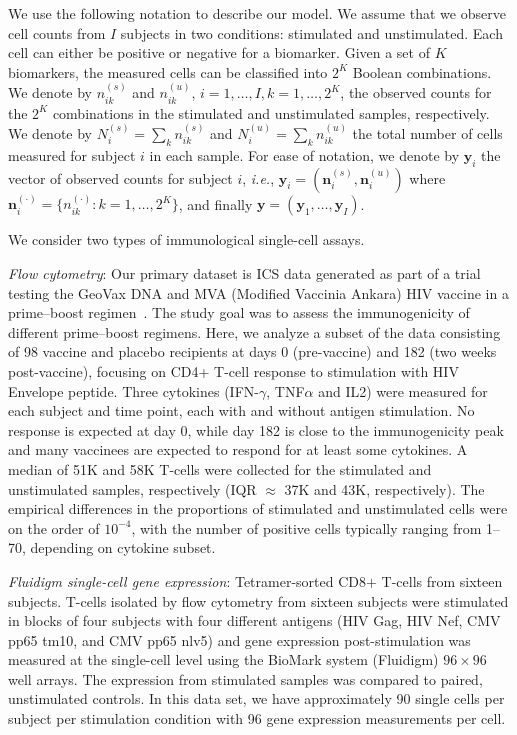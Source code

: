 \documentclass[12pt,oupdraft]{biostatistics}
\begin{document}
We use the following notation to describe our model.  We assume that we observe cell counts from $I$ subjects in two conditions: stimulated and unstimulated. Each cell can either be positive or negative for a biomarker. Given a set of $K$ biomarkers, the measured cells can be classified into $2^K$ Boolean combinations. We denote by $n^{(s)}_{ik}$ and $n^{(u)}_{ik}$, $i=1,\dots,I,k=1,\dots, 2^K$, the observed counts for the $2^K$ combinations in the stimulated and unstimulated samples, respectively. We denote by $N^{(s)}_{i}=\sum_k n^{(s)}_{ik}$ and $N^{(u)}_{i}=\sum_k n^{(u)}_{ik}$ the total number of cells measured for subject $i$ in each sample. For ease of notation, we denote by $\mathbf{y}_i$ the vector of observed counts for subject $i$, \textit{i.e.}, $\mathbf{y}_{i}=(\mathbf{n}^{(s)}_{i}, \mathbf{n}^{(u)}_{i})$ where $\mathbf{n}^{(\cdot)}_{i}=\{n^{(\cdot)}_{ik}: k=1,\dots,2^K\}$, and finally $\mathbf{y}=(\mathbf{y}_1,\dots,\mathbf{y}_I)$.

We consider two types of immunological single-cell assays.

\noindent\textit{Flow cytometry}:
Our primary dataset is ICS data generated as part of a  trial testing the GeoVax DNA and MVA (Modified Vaccinia Ankara) HIV vaccine in a prime--boost regimen~\citep{Goepfert:2011ci}.
The study goal was to assess the immunogenicity of different prime--boost regimens.
Here, we analyze a subset of the data consisting of 98 vaccine and placebo recipients at days 0 (pre-vaccine) and 182 (two weeks post-vaccine), focusing on CD4+ T-cell response to stimulation with HIV Envelope peptide.
Three cytokines (IFN-$\gamma$, TNF$\alpha$ and IL2) were measured for each subject and time point, each with and without antigen stimulation. No response is expected at day 0, while day 182 is close to the immunogenicity peak and many vaccinees are expected to respond for at least some cytokines. A median of 51K and 58K T-cells were collected for the stimulated and unstimulated samples, respectively (IQR $\approx$ 37K and 43K, respectively). The empirical differences in the proportions of stimulated and unstimulated cells were on the order of $10^{-4}$, with the number of positive cells typically ranging from 1--70, depending on cytokine subset. 

\noindent\textit{Fluidigm single-cell gene expression}: Tetramer-sorted CD8$+$ T-cells from sixteen subjects. T-cells isolated by flow cytometry from sixteen subjects were stimulated in blocks of four subjects with four different antigens (HIV Gag, HIV Nef, CMV pp65 tm10, and CMV pp65 nlv5) and gene expression post-stimulation was measured at the single-cell level using the BioMark system (Fluidigm) $96 \times 96$ well arrays. The expression from stimulated samples  was compared to paired, unstimulated controls. In this data set, we have approximately 90 single cells per subject per stimulation condition with 96 gene expression measurements per cell.
\end{document}
